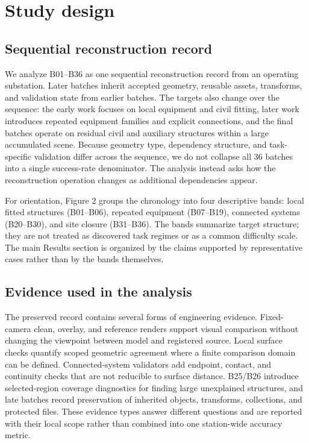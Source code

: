 \documentclass[10pt,a4paper]{article}
\begin{document}
\hypertarget{study-design}{%
\section{Study design}\label{study-design}}

\hypertarget{sequential-reconstruction-record}{%
\subsection{Sequential reconstruction
record}\label{sequential-reconstruction-record}}

We analyze B01--B36 as one sequential reconstruction record from an
operating substation. Later batches inherit accepted geometry, reusable
assets, transforms, and validation state from earlier batches. The
targets also change over the sequence: the early work focuses on local
equipment and civil fitting, later work introduces repeated equipment
families and explicit connections, and the final batches operate on
residual civil and auxiliary structures within a large accumulated
scene. Because geometry type, dependency structure, and task-specific
validation differ across the sequence, we do not collapse all 36 batches
into a single success-rate denominator. The analysis instead asks how
the reconstruction operation changes as additional dependencies appear.

For orientation, Figure 2 groups the chronology into four descriptive
bands: local fitted structures (B01--B06), repeated equipment
(B07--B19), connected systems (B20--B30), and site closure (B31--B36).
The bands summarize target structure; they are not treated as discovered
task regimes or as a common difficulty scale. The main Results section
is organized by the claims supported by representative cases rather than
by the bands themselves.

\hypertarget{evidence-used-in-the-analysis}{%
\subsection{Evidence used in the
analysis}\label{evidence-used-in-the-analysis}}

The preserved record contains several forms of engineering evidence.
Fixed-camera clean, overlay, and reference renders support visual
comparison without changing the viewpoint between model and registered
source. Local surface checks quantify scoped geometric agreement where a
finite comparison domain can be defined. Connected-system validators add
endpoint, contact, and continuity checks that are not reducible to
surface distance. B25/B26 introduce selected-region coverage diagnostics
for finding large unexplained structures, and late batches record
preservation of inherited objects, transforms, collections, and
protected files. These evidence types answer different questions and are
reported with their local scope rather than combined into one
station-wide accuracy metric.
\end{document}
